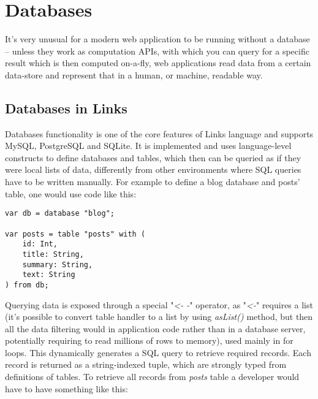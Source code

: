 
\chapter{Databases}

It's very unusual for a modern web application to be running without a database – unless they work as computation APIs, with which you can query for a specific result which is then computed on-a-fly, web applications read data from a certain data-store and represent that in a human, or machine, readable way.

\section{Databases in Links}

Databases functionality is one of the core features of Links language and supports MySQL, PostgreSQL and SQLite. It is implemented and uses language-level constructs to define databases and tables, which then can be queried as if they were local lists of data, differently from other environments where SQL queries have to be written manually. For example to define a blog database and posts' table, one would use code like this:

\begin{codelisting}
\begin{verbatim}
var db = database "blog"; 

var posts = table "posts" with ( 
    id: Int, 
    title: String, 
    summary: String, 
    text: String 
) from db;
\end{verbatim}
\end{codelisting}

Querying data is exposed through a special "\textit{\textless- -}" operator, as "\textit{\textless-}" requires a list (it's possible to convert table handler to a list by using \textit{asList()} method, but then all the data filtering would in application code rather than in a database server, potentially requiring to read millions of rows to memory), used mainly in for loops. This dynamically generates a SQL query to retrieve required records. Each record is returned as a string-indexed tuple, which are strongly typed from definitions of tables. To retrieve all records from \textit{posts} table a developer would have to have something like this:

